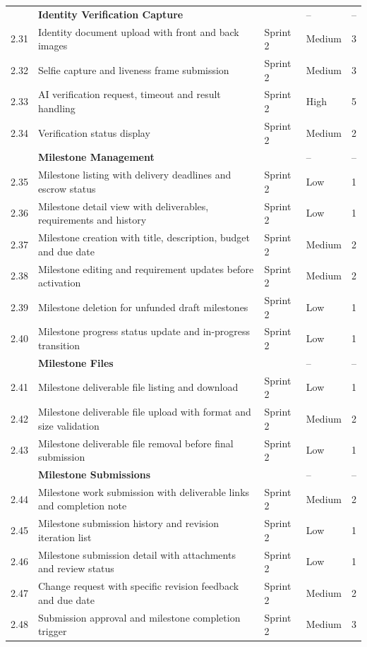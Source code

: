 \begin{longtable}{|
C{1.0cm}|
L{6.9cm}|
C{1.8cm}|
C{2.1cm}|
C{2.3cm}|}
 & \textbf{Identity Verification Capture} &  & -- & -- \\
2.31 & Identity document upload with front and back images & Sprint 2 & Medium & 3 \\
2.32 & Selfie capture and liveness frame submission & Sprint 2 & Medium & 3 \\
2.33 & AI verification request, timeout and result handling & Sprint 2 & High & 5 \\
2.34 & Verification status display & Sprint 2 & Medium & 2 \\
\hline

 & \textbf{Milestone Management} &  & -- & -- \\
2.35 & Milestone listing with delivery deadlines and escrow status & Sprint 2 & Low & 1 \\
2.36 & Milestone detail view with deliverables, requirements and history & Sprint 2 & Low & 1 \\
2.37 & Milestone creation with title, description, budget and due date & Sprint 2 & Medium & 2 \\
2.38 & Milestone editing and requirement updates before activation & Sprint 2 & Medium & 2 \\
2.39 & Milestone deletion for unfunded draft milestones & Sprint 2 & Low & 1 \\
2.40 & Milestone progress status update and in-progress transition & Sprint 2 & Low & 1 \\
\hline

 & \textbf{Milestone Files} &  & -- & -- \\
2.41 & Milestone deliverable file listing and download & Sprint 2 & Low & 1 \\
2.42 & Milestone deliverable file upload with format and size validation & Sprint 2 & Medium & 2 \\
2.43 & Milestone deliverable file removal before final submission & Sprint 2 & Low & 1 \\
\hline

 & \textbf{Milestone Submissions} &  & -- & -- \\
2.44 & Milestone work submission with deliverable links and completion note & Sprint 2 & Medium & 2 \\
2.45 & Milestone submission history and revision iteration list & Sprint 2 & Low & 1 \\
2.46 & Milestone submission detail with attachments and review status & Sprint 2 & Low & 1 \\
2.47 & Change request with specific revision feedback and due date & Sprint 2 & Medium & 2 \\
2.48 & Submission approval and milestone completion trigger & Sprint 2 & Medium & 3 \\
\hline


\end{longtable}
